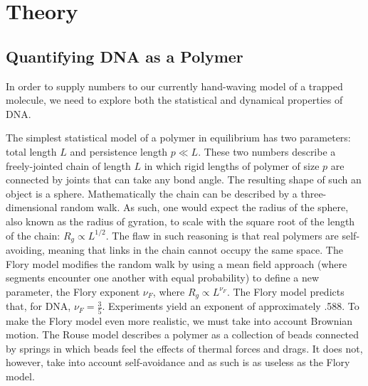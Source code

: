 \documentclass[aps,prl,preprint,groupedaddress]{revtex4}
\begin{document}
\section{Theory}

\subsection{Quantifying DNA as a Polymer}

In order to supply numbers to our currently hand-waving model of a trapped molecule, we need to explore both the statistical and dynamical properties of DNA.

The simplest statistical model of a polymer in equilibrium has two parameters: total length \(L\) and persistence length \(p \ll L\). These two numbers describe a freely-jointed chain of length \(L\) in which rigid lengths of polymer of size \(p\) are connected by joints that can take any bond angle. The resulting shape of such an object is a sphere. Mathematically the chain can be described by a three-dimensional random walk. As such, one would expect the radius of the sphere, also known as the radius of gyration, to scale with the square root of the length of the chain: \(R_g \propto L^{1/2}\). The flaw in such reasoning is that real polymers are self-avoiding, meaning that links in the chain cannot occupy the same space. The Flory model modifies the random walk by using a mean field approach (where segments encounter one another with equal probability) to define a new parameter, the Flory exponent \(\nu_F\), where \(R_g \propto L^{\nu_F}\). The Flory model predicts that, for DNA, \(\nu_F = \frac{3}{5}\). Experiments yield an exponent of approximately .588. To make the Flory model even more realistic, we must take into account Brownian motion. The Rouse model describes a polymer as a collection of beads connected by springs in which beads feel the effects of thermal forces and drags. It does not, however, take into account self-avoidance and as such is as useless as the Flory model. 
\end{document}
